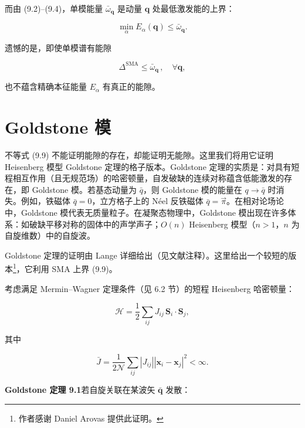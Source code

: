 而由 (9.2)--(9.4)，单模能量 $\bar{\omega}_{\mathbf{q}}$ 是动量 $\mathbf{q}$ 处最低激发能的上界：

\begin{equation*}
\min_{\alpha} E _ {\alpha} ( \mathbf {q} ) \leq \bar {\omega} _ {\mathbf {q}}.
\tag{9.9}
\end{equation*}

遗憾的是，即使单模谱有能隙

\begin{equation*}
\Delta^ {\mathrm{SMA}} \leq \bar {\omega} _ {\mathbf {q}} \, , \quad \forall \mathbf {q} ,
\tag{9.10}
\end{equation*}

也不蕴含精确本征能量 $E_{\alpha}$ 有真正的能隙。

\section{Goldstone 模}

不等式 (9.9) 不能证明能隙的存在，却能证明无能隙。这里我们将用它证明 Heisenberg 模型 Goldstone 定理的格子版本。Goldstone 定理的实质是：对具有短程相互作用（且无规范场）的哈密顿量，自发破缺的连续对称蕴含低能激发的存在，即 Goldstone 模。若基态动量为 $\bar{q}$，则 Goldstone 模的能量在 $q \rightarrow \bar{q}$ 时消失。例如，铁磁体 $\bar{q} = 0$，立方格子上的 Néel 反铁磁体 $\bar{q} = \vec{\pi}$。在相对论场论中，Goldstone 模代表无质量粒子。在凝聚态物理中，Goldstone 模出现在许多体系：如破缺平移对称的固体中的声学声子；$O(n)$ Heisenberg 模型（$n > 1$，$n$ 为自旋维数）中的自旋波。

Goldstone 定理的证明由 Lange 详细给出（见文献注释）。这里给出一个较短的版本\footnote{作者感谢 Daniel Arovas 提供此证明。}，它利用 SMA 上界 (9.9)。

考虑满足 Mermin--Wagner 定理条件（见 6.2 节）的短程 Heisenberg 哈密顿量：

\begin{equation*}
\mathcal {H} = \frac {1}{2} \sum_ {ij} J _ {ij} \, \mathbf {S} _ {i} \cdot \mathbf {S} _ {j} ,
\tag{9.11}
\end{equation*}

其中

\begin{equation*}
\bar {J} = \frac {1}{2 \mathcal {N}} \sum_ {ij} \left| J _ {ij} \right| \left| \mathbf {x} _ {i} - \mathbf {x} _ {j} \right| ^ {2} < \infty .
\tag{9.12}
\end{equation*}

\medskip
\noindent\textbf{Goldstone 定理 9.1}\quad 若自旋关联在某波矢 $\bar{\mathbf{q}}$ 发散：

